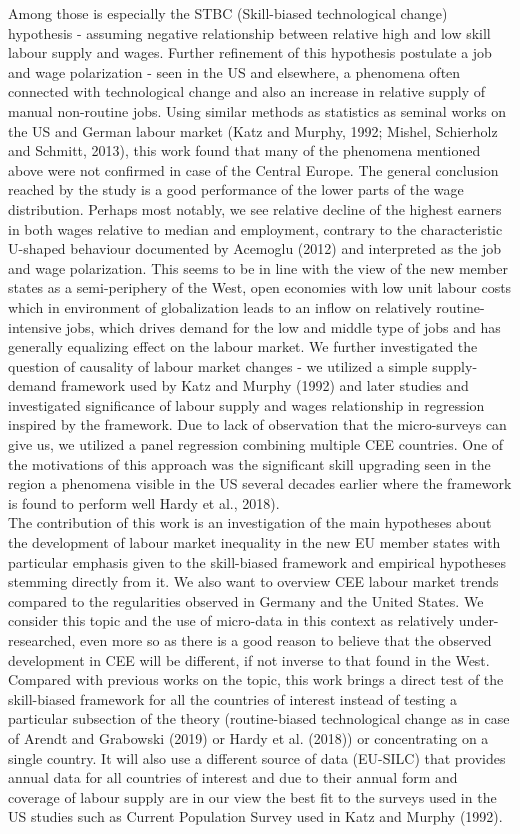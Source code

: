 \documentclass{article}
\begin{document}
Among those is especially the STBC (Skill-biased technological change) hypothesis - assuming negative relationship between relative high and low skill labour supply and wages. Further refinement of this hypothesis postulate a job and wage polarization - seen in the US and elsewhere, a phenomena often connected with technological change and also an increase in relative supply of manual non-routine jobs. Using similar methods as statistics as seminal works on the US and German labour market (Katz and Murphy, 1992; Mishel, Schierholz and Schmitt, 2013), this work found that many of the phenomena mentioned above were not confirmed in case of the Central Europe. The general conclusion reached by the study is a good performance of the lower parts of the wage distribution. Perhaps most notably, we see relative decline of the highest earners in both wages relative to median and employment, contrary to the characteristic U-shaped behaviour documented by Acemoglu (2012) and interpreted as the job and wage polarization. This seems to be in line with the view of the new member states as a semi-periphery of the West, open economies with low unit labour costs which in environment of globalization leads to an inflow on relatively routine-intensive jobs, which drives demand for the low and middle type of jobs and has generally equalizing effect on the labour market. 
We further investigated the question of causality of labour market changes - we utilized a simple supply-demand framework used by Katz and Murphy (1992) and later studies and investigated significance of labour supply and wages relationship in regression inspired by the framework. Due to lack of observation that the micro-surveys can give us, we utilized a panel regression combining multiple CEE countries. One of the motivations of this approach was the significant skill upgrading seen in the region a phenomena visible in the US several decades earlier where the framework is found to perform well Hardy et al., 2018).
\\
The contribution of this work is an investigation of the main hypotheses about the development of labour market inequality in the new EU member states with particular emphasis given to the skill-biased framework and empirical hypotheses stemming directly from it. We also want to overview CEE labour market trends compared to the regularities observed in Germany and the United States. We consider this topic and the use of micro-data in this context as relatively under-researched, even more so as there is a good reason to believe that the observed development in CEE will be different, if not inverse to that found in the West. Compared with previous works on the topic, this work brings a direct test of the skill-biased framework for all the countries of interest instead of testing a particular subsection of the theory (routine-biased technological change as in case of Arendt and Grabowski (2019) or Hardy et al. (2018)) or concentrating on a single country. It will also use a different source of data (EU-SILC) that provides annual data for all countries of interest and due to their annual form and coverage of labour supply are in our view the best fit to the surveys used in the US studies such as Current Population Survey used in Katz and Murphy (1992). \\
\end{document}
